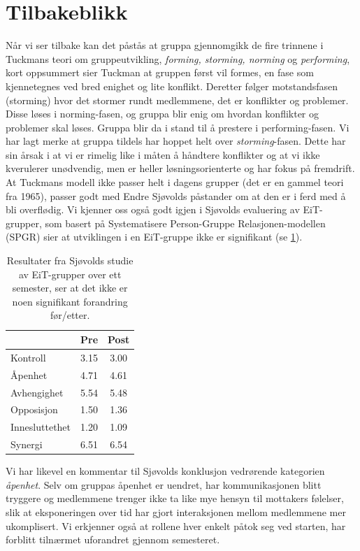 \section{Tilbakeblikk}
\label{sec:tilbakeblikk}

Når vi ser tilbake kan det påstås at gruppa gjennomgikk de fire trinnene i
Tuckmans \cite{tuckman} teori om gruppeutvikling, \emph{forming, storming,
norming} og \emph{performing}, kort oppsummert sier Tuckman at gruppen først vil
formes, en fase som kjennetegnes ved bred enighet og lite konflikt. Deretter
følger motstandsfasen (storming) hvor det stormer rundt medlemmene, det er
konflikter og problemer. Disse løses i norming-fasen, og gruppa blir enig om
hvordan konflikter og problemer skal løses. Gruppa blir da i stand til å
prestere i performing-fasen. Vi har lagt merke at gruppa tildels har hoppet helt over
\emph{storming}-fasen. Dette har sin årsak i at vi er rimelig like i måten å
håndtere konflikter og at vi ikke kverulerer unødvendig, men er heller
løsningsorienterte og har fokus på fremdrift. At Tuckmans modell ikke passer
helt i dagens grupper (det er en gammel teori fra 1965), passer godt med Endre
Sjøvolds \cite{sjovold} påstander om at den er i ferd med å bli overflødig. Vi
kjenner oss også godt igjen i Sjøvolds evaluering av EiT-grupper, som basert på
Systematisere Person-Gruppe Relasjonen-modellen (SPGR) sier at utviklingen i en
EiT-gruppe ikke er signifikant (se \cref{tab:sjovold}).\\

\begin{table}[H]
\centering
\begin{tabular}{l c c}
\toprule
& Pre & Post  \\
\midrule
Kontroll & 3.15 & 3.00 \\
Åpenhet & 4.71 & 4.61 \\
Avhengighet & 5.54 & 5.48 \\
Opposisjon & 1.50 & 1.36 \\
Innesluttethet & 1.20 & 1.09 \\
Synergi & 6.51 & 6.54 \\
\bottomrule
\end{tabular}
\caption{Resultater fra Sjøvolds studie av EiT-grupper over ett semester, ser at
det ikke er noen signifikant forandring før/etter.}
\label{tab:sjovold}
\end{table}

Vi har likevel en kommentar til Sjøvolds konklusjon vedrørende kategorien
\emph{åpenhet}. Selv om gruppas åpenhet er uendret, har kommunikasjonen blitt
tryggere og medlemmene trenger ikke ta like mye hensyn til mottakers følelser, 
slik at eksponeringen over tid har gjort interaksjonen mellom
medlemmene mer ukomplisert. Vi erkjenner også at rollene hver enkelt påtok
seg ved starten, har forblitt tilnærmet uforandret gjennom semesteret.

